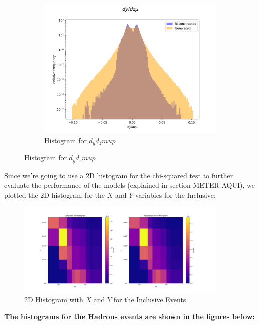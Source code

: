 \documentclass{article}
\begin{document}
\begin{figure}[H]
    \centering
    \begin{subfigure}[b]{0.45\textwidth}
        \includegraphics[width=\textwidth]{graphs/incl_dy_dz_mu.png}
        \caption{Histogram for $d_yd_zmup$}
        \label{fig:incl_Angle_mu}
    \end{subfigure}
    \caption{Histogram for $d_yd_zmup$}
\end{figure}

Since we're going to use a 2D histogram for the chi-squared test to further evaluate the performance of the models (explained in section METER AQUI), we plotted the 2D histogram for the $X$ and $Y$ variables for the Inclusive:

\begin{figure}[H]
    \centering
    \includegraphics[width=0.9\textwidth]{graphs/incl_xb_y.png}
    \caption{2D Histogram with $X$ and $Y$ for the Inclusive Events}
    \label{fig:inclusive_2D_histogram}
\end{figure}

\textbf{The histograms for the Hadrons events are shown in the figures below:}
\end{document}
